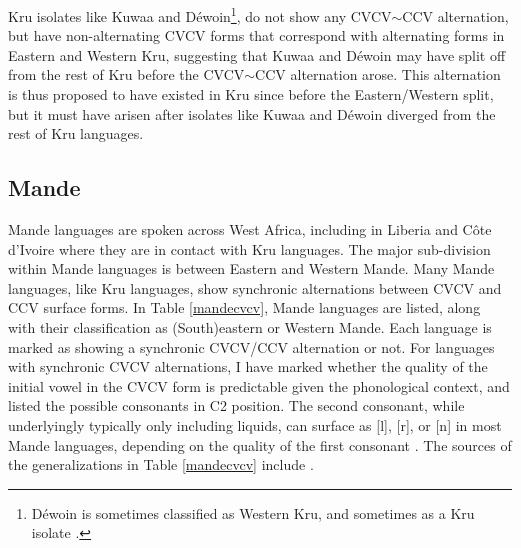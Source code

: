 \documentclass[output=paper,colorlinks,citecolor=brown]{langscibook}
\begin{document}
Kru isolates like Kuwaa and Déwoin\footnote{Déwoin is sometimes classified as Western Kru, and sometimes as a Kru isolate \citep{Marchese:1979, Zogbo:2012}.}, do not show any CVCV$\sim$CCV alternation, but have non-alternating CVCV forms that correspond with alternating forms in Eastern and Western Kru, suggesting that Kuwaa and Déwoin may have split off from the rest of Kru before the CVCV$\sim$CCV alternation arose. This alternation is thus proposed to have existed in Kru since before the Eastern/Western split, but it must have arisen after isolates like Kuwaa and Déwoin diverged from the rest of Kru languages.

\subsection{Mande}\label{sec:mande}
Mande languages are spoken across West Africa, including in Liberia and Côte d'Ivoire where they are in contact with Kru languages. The major sub-division within Mande languages is between Eastern and Western Mande. Many Mande languages, like Kru languages, show synchronic alternations between CVCV and CCV surface forms. In Table \ref{mandecvcv}, Mande languages are listed, along with their classification as (South)eastern or Western Mande. Each language is marked as showing a synchronic CVCV\slash CCV alternation or not. For languages with synchronic CVCV alternations, I have marked whether the quality of the initial vowel in the CVCV form is predictable given the phonological context, and listed the possible consonants in C2 position. The second consonant, while underlyingly typically only including liquids, can surface as [l], [r], or [n] in most Mande languages, depending on the quality of the first consonant \citep{Vydrine:2004}. The sources of the generalizations in Table \ref{mandecvcv} include \citet{LeSaout:1974,Morse:1976,Diallo:1988,Grossmann:1982,Dumestre:2003,Vydrine:2004,Babaev:2011,Sadler:2015,Khachaturyan:2015,Vydrina:2017, McPherson:2020}.
\end{document}
